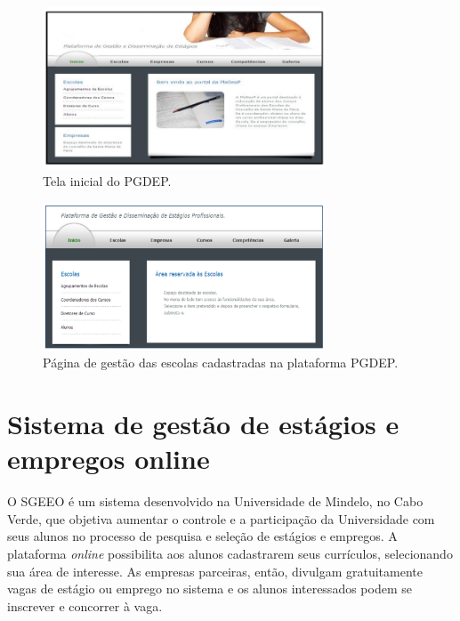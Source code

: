 \begin{figure}[h]
    \caption{Tela inicial do PGDEP.}
       	\begin{center}
            \includegraphics[width=0.75\textwidth]{figuras/rel03.png}
        \end{center}
    \label{telaHomePGDEP}
\end{figure}

\begin{figure}[h]
    \caption{Página de gestão das escolas cadastradas na plataforma PGDEP.}
       	\begin{center}
            \includegraphics[width=0.75\textwidth]{figuras/rel04.png}
        \end{center}
    \label{telaEscolaPGDEP}
\end{figure}

\section{Sistema de gestão de estágios e empregos online}
\label{trabRelSistEmprego}

O SGEEO \cite{SGEEOMono} é um sistema desenvolvido na Universidade de Mindelo, no Cabo Verde, que objetiva aumentar o controle e a participação da Universidade com seus alunos no processo de pesquisa e seleção de estágios e empregos. A plataforma \textit{online} possibilita aos alunos cadastrarem seus currículos, selecionando sua área de interesse. As empresas parceiras, então, divulgam gratuitamente vagas de estágio ou emprego no sistema e os alunos interessados podem se inscrever e concorrer à vaga.

